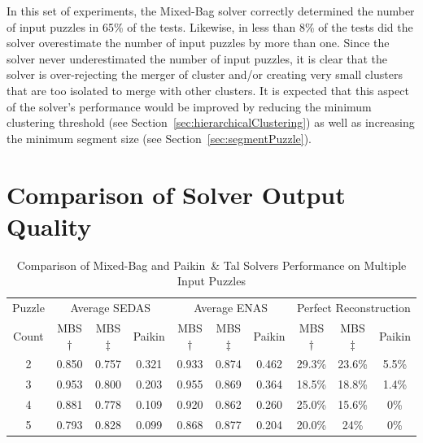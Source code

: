 In this set of experiments, the Mixed-Bag solver correctly determined the number of input puzzles in 65\% of the tests.  Likewise, in less than 8\% of the tests did the solver overestimate the number of input puzzles by more than one.  Since the solver never underestimated the number of input puzzles, it is clear that the solver is over-rejecting the merger of cluster and/or creating very small clusters that are too isolated to merge with other clusters.  It is expected that this aspect of the solver's performance would be improved by reducing the minimum clustering threshold (see Section~\ref{sec:hierarchicalClustering}) as well as increasing the minimum segment size (see Section~\ref{sec:segmentPuzzle}). 

\section{Comparison of Solver Output Quality}\label{sec:comparisonOfSolverOutputQuality}


\begin{table}[tb]
\begin{center}
\begin{tabular}{ c||c|c|c||c|c|c||c|c|c } 
 \toprule
 Puzzle & \multicolumn{3}{c||}{Average SEDAS} & \multicolumn{3}{c||}{Average ENAS} & \multicolumn{3}{c}{Perfect Reconstruction} \\ \cline{2-10}
 Count & MBS$\dagger$ & MBS$\ddagger$ & Paikin & MBS$\dagger$ & MBS$\ddagger$ & Paikin & MBS$\dagger$ & MBS$\ddagger$ & Paikin \\ 
 \hline \hline
 
	2 & 0.850 & 0.757 & 0.321 & 0.933 & 0.874 & 0.462 & 29.3\% & 23.6\% & 5.5\% \\ \hline
 
	3 & 0.953 & 0.800 & 0.203 & 0.955 & 0.869 & 0.364 & 18.5\% & 18.8\% & 1.4\% \\ \hline
  
	4 & 0.881 & 0.778 & 0.109 & 0.920 & 0.862 & 0.260 & 25.0\% & 15.6\% & 0\% \\ \hline
  
	5 & 0.793 & 0.828 & 0.099 & 0.868 & 0.877 & 0.204 & 20.0\% & 24\% & 0\% \\ 
 \bottomrule
\end{tabular}
\end{center}
\caption{Comparison of Mixed-Bag and Paikin~\& Tal Solvers Performance on Multiple Input Puzzles}\label{tab:tableSolverPerformanceComparison}
\end{table}

